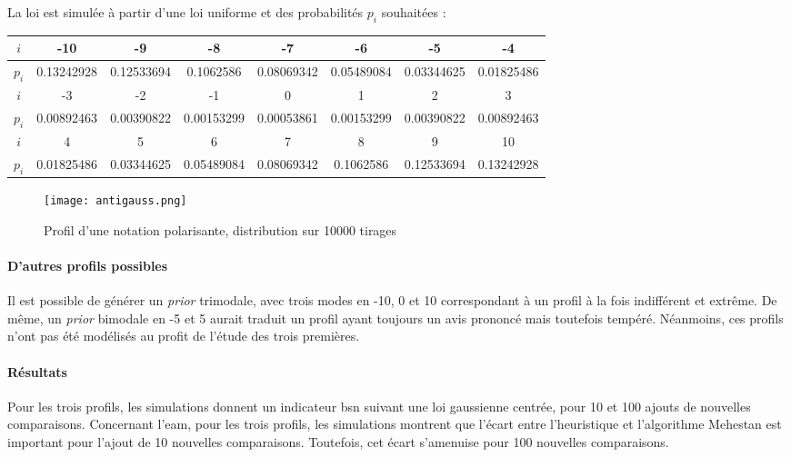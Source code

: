 La loi est simulée à partir d'une loi uniforme et des probabilités $p_i$ souhaitées :
\begin{center}
\begin{tabular}{ |c|c|c|c|c|c|c|c| } 
\hline
$i$ & -10 & -9 & -8 & -7 & -6 & -5 & -4  \\
\hline
$p_i$ & 0.13242928 & 0.12533694 & 0.1062586 & 0.08069342 & 0.05489084 & 0.03344625 & 0.01825486  \\ 
\hline

$i$ & -3 & -2 & -1 & 0 & 1 & 2 & 3 \\
\hline
$p_i$ &  0.00892463 & 0.00390822 & 0.00153299 & 0.00053861 & 0.00153299 & 0.00390822 & 0.00892463  \\
\hline
$i$ & 4 & 5 & 6 & 7 & 8 & 9 & 10 \\
\hline
$p_i$ & 0.01825486 & 0.03344625 & 0.05489084 & 0.08069342 & 0.1062586 & 0.12533694 & 0.13242928\\
\hline
\end{tabular}
\end{center}
 
\begin{figure}[h!]
  \centering
  \texttt{[image: antigauss.png]}
  \caption{Profil d'une notation polarisante, distribution sur 10000 tirages}
\end{figure}

\paragraph{D'autres profils possibles}

Il est possible de générer un \textit{prior} trimodale, avec trois modes en -10, 0 et 10 correspondant à un profil à la fois indifférent et extrême. De même, un \textit{prior} bimodale en -5 et 5 aurait traduit un profil ayant toujours un avis prononcé mais toutefois tempéré. Néanmoins, ces profils n'ont pas été modélisés au profit de l'étude des trois premières.

\paragraph{Résultats}

Pour les trois profils, les simulations donnent un indicateur \gls{bsn} suivant une loi gaussienne centrée, pour 10 et 100 ajouts de nouvelles comparaisons.
Concernant l'\gls{eam}, pour les trois profils, les simulations montrent que l'écart entre l'heuristique et l'algorithme Mehestan est important pour l'ajout de 10 nouvelles comparaisons. Toutefois, cet écart s'amenuise pour 100 nouvelles comparaisons.


